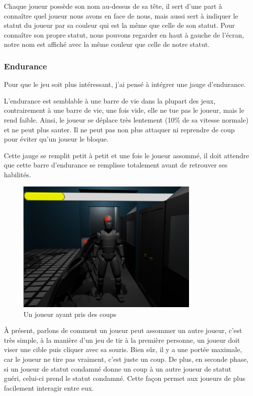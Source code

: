 \documentclass{article}
\begin{document}


Chaque joueur possède son nom au-dessus de sa tête, il sert d'une part à connaître quel joueur nous avons en face de nous, mais aussi sert à indiquer le statut du joueur par sa couleur qui est la même que celle de son statut.
Pour connaître son propre statut, nous pouvons regarder en haut à gauche de l'écran, notre nom est affiché avec la même couleur que celle de notre statut.


\subsubsection{Endurance}


Pour que le jeu soit plus intéressant, j'ai pensé à intégrer une jauge d'endurance.


L'endurance est semblable à une barre de vie dans la plupart des jeux, contrairement à une barre de vie, une fois vide, elle ne tue pas le joueur, mais le rend faible. Ainsi, le joueur se déplace très lentement (10\% de sa vitesse normale) et ne peut plus sauter. Il ne peut pas non plus attaquer ni reprendre de coup pour éviter qu'un joueur le bloque.


Cette jauge se remplit petit à petit et une fois le joueur assommé, il doit attendre que cette barre d'endurance se remplisse totalement avant de retrouver ses habilités.


\begin{figure}[H]
\centering
\includegraphics[width=0.8\textwidth]{cc/stamina.png}
\caption{Un joueur ayant pris des coups}
\label{cc_a}
\end{figure}


À présent, parlons de comment un joueur peut assommer un autre joueur, c'est très simple, à la manière d'un jeu de tir à la première personne, un joueur doit viser une cible puis cliquer avec sa souris. Bien sûr, il y a une portée maximale, car le joueur ne tire pas vraiment, c'est juste un coup. De plus, en seconde phase, si un joueur de statut condamné donne un coup à un autre joueur de statut guéri, celui-ci prend le statut condamné. Cette façon permet aux joueurs de plus facilement interagir entre eux.
\end{document}

